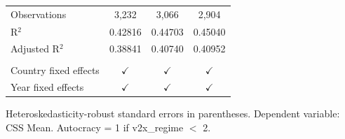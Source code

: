 \begin{table}[htbp]
\begin{tabular}{lccc}
       \\
      Observations          & 3,232          & 3,066         & 2,904\\  
      R$^2$                 & 0.42816        & 0.44703       & 0.45040\\  
      Adjusted R$^2$        & 0.38841        & 0.40740       & 0.40952\\  
       \\
      Country fixed effects & $\checkmark$   & $\checkmark$  & $\checkmark$\\   
      Year fixed effects    & $\checkmark$   & $\checkmark$  & $\checkmark$\\   
      \bottomrule
   \end{tabular}
   
   \par \raggedright 
   Heteroskedasticity-robust standard errors in parentheses. Dependent variable: CSS Mean. Autocracy = 1 if v2x\_regime $<$ 2.
\end{table}


